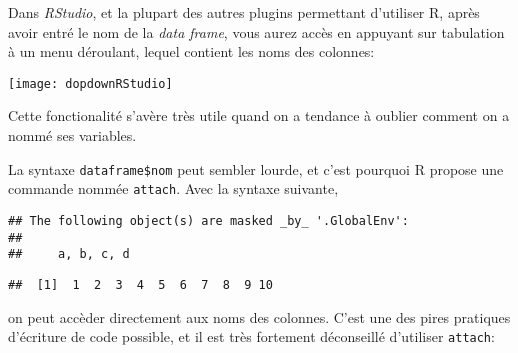 Dans \emph{RStudio}, et la plupart des autres plugins permettant d'utiliser R, après avoir entré le nom de la \emph{data frame}, vous aurez accès en appuyant sur tabulation à un menu déroulant,
lequel contient les noms des colonnes: 

\begin{center}
\texttt{[image: dopdownRStudio]}
\end{center}

Cette fonctionalité s'avère très utile quand on a tendance à oublier comment on a nommé ses variables.

La syntaxe \texttt{dataframe\$nom} peut sembler lourde, et c'est pourquoi R propose une commande nommée \texttt{attach}.
Avec la syntaxe suivante,

\begin{knitrout}
\color{fgcolor}\begin{kframe}
\begin{flushleft}
\ttfamily\noindent
{}\hlkeyword{(}\hlkeyword{)}\mbox{}
\normalfont
\end{flushleft}
\begin{verbatim}
## The following object(s) are masked _by_ '.GlobalEnv':
## 
##     a, b, c, d
\end{verbatim}
\begin{flushleft}
\ttfamily\noindent
{}\mbox{}
\normalfont
\end{flushleft}
\begin{verbatim}
##  [1]  1  2  3  4  5  6  7  8  9 10
\end{verbatim}
\begin{flushleft}
\ttfamily\noindent
{}\hlkeyword{(}\hlkeyword{)}\mbox{}
\normalfont
\end{flushleft}
\end{kframe}
\end{knitrout}


\noindent on peut accèder directement aux noms des colonnes.
C'est une des pires pratiques d'écriture de code possible, et il est très fortement déconseillé d'utiliser \texttt{attach}:

